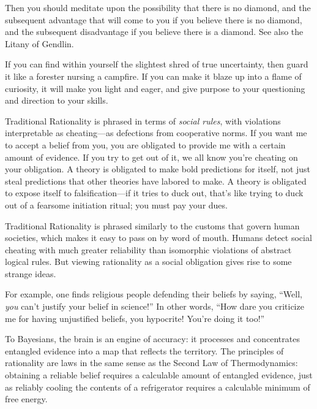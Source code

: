 {
 Then you should meditate upon the possibility that there is no
diamond, and the subsequent advantage that will come to you if you
believe there is no diamond, and the subsequent disadvantage if you
believe there is a diamond. See also the Litany of Gendlin.}

{
 If you can find within yourself the slightest shred of true
uncertainty, then guard it like a forester nursing a campfire. If you
can make it blaze up into a flame of curiosity, it will make you light
and eager, and give purpose to your questioning and direction to your
skills.}

\myendsectiontext


\bigskip


{
 Traditional Rationality is phrased in terms of \textit{social
rules}, with violations interpretable as cheating---as defections from
cooperative norms. If you want me to accept a belief from you, you are
obligated to provide me with a certain amount of evidence. If you try
to get out of it, we all know you're cheating on your
obligation. A theory is obligated to make bold predictions for itself,
not just steal predictions that other theories have labored to make. A
theory is obligated to expose itself to falsification---if it tries to
duck out, that's like trying to duck out of a fearsome
initiation ritual; you must pay your dues. }

{
 Traditional Rationality is phrased similarly to the customs that
govern human societies, which makes it easy to pass on by word of
mouth. Humans detect social cheating with much greater reliability than
isomorphic violations of abstract logical rules. But viewing
rationality as a social obligation gives rise to some strange ideas.}

{
 For example, one finds religious people defending their beliefs by
saying, ``Well, \textit{you} can't
justify your belief in science!'' In other words,
``How dare you criticize me for having unjustified
beliefs, you hypocrite! You're doing it
too!''}

{
 To Bayesians, the brain is an engine of accuracy: it processes and
concentrates entangled evidence into a map that reflects the territory.
The principles of rationality are laws in the same sense as the Second
Law of Thermodynamics: obtaining a reliable belief requires a
calculable amount of entangled evidence, just as reliably cooling the
contents of a refrigerator requires a calculable minimum of free
energy.}

